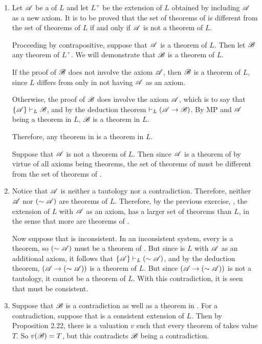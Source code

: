 \begin{enumerate}
  \item %
    Let \(\mathscr{A}\) be a \wf{} of \(L\) and let \(L^+\) be the extension of \(L\) obtained by including \(\mathscr{A}\) as a new axiom. It is to be proved that the set of theorems of \Lp{} is different from the set of theorems of \(L\) if and only if \(\mathscr{A}\) is not a theorem of \(L\).

    \Ra{} Proceeding by contrapositive, suppose that \(\mathscr{A}\) is a theorem of \(L\). Then let \(\mathscr{B}\) any theorem of \(L^+\). We will demonstrate that \(\mathscr{B}\) is a theorem of \(L\).

    If the proof of \(\mathscr{B}\) does not involve the axiom \(\mathscr{A}\), then \(\mathscr{B}\) is a theorem of \(L\), since \(L\) differs from \Lp{} only in not having \(\mathscr{A}\) as an axiom.

    Otherwise, the proof of \(\mathscr{B}\) does involve the axiom \(\mathscr{A}\), which is to say that \(\{\mathscr{A}\} \vdash_{L} \mathscr{B}\), and by the deduction theorem \(\vdash_{L} (\mathscr{A} \rightarrow \mathscr{B})\). By MP and \(\mathscr{A}\) being a theorem in \(L\), \(\mathscr{B}\) is a theorem in \(L\).

    Therefore, any theorem in \Lp{} is a theorem in \(L\).

    \La{} Suppose that \(\mathscr{A}\) is not a theorem of \(L\). Then since \(\mathscr{A}\) is a theorem of \Lp{} by virtue of all axioms being theorems, the set of theorems of \Lp{} must be different from the set of theorems of \Lp{}.

  \item %
    Notice that \(\mathscr{A}\) is neither a tautology nor a contradiction. Therefore, neither \(\mathscr{A}\) nor \((\sim\mathscr{A})\) are theorems of \(L\). Therefore, by the previous exercise, \Lp{}, the extension of \(L\) with \(\mathscr{A}\) as an axiom, has a larger set of theorems than \(L\), in the sense that more \wfs{} are theorems of \Lp{}.

    Now suppose that \Lp{} is inconsistent. In an inconsistent system, every \wf{} is a theorem, so \((\sim\mathscr{A})\) must be a theorem of \Lp. But since \Lp{} is \(L\) with \(\mathscr{A}\) as an additional axiom, it follows that \(\{\mathscr{A}\} \vdash_{L} (\sim\mathscr{A})\), and by the deduction theorem, \((\mathscr{A} \rightarrow (\sim\mathscr{A}))\) is a theorem of \(L\). But since \((\mathscr{A} \rightarrow (\sim\mathscr{A}))\) is not a tautology, it cannot be a theorem of \(L\). With this contradiction, it is seen that \Lp{} must be consistent.

  \item %
    Suppose that \(\mathscr{B}\) is a contradiction as well as a theorem in \Lp{}. For a contradiction, suppose that \Lp{} is a consistent extension of \(L\). Then by Proposition 2.22, there is a valuation \(v\) such that every theorem of \Lext{} takes value \(T\). So \(v(\mathscr{B}) = T\), but this contradicts \(\mathscr{B}\) being a contradiction.


\end{enumerate}
